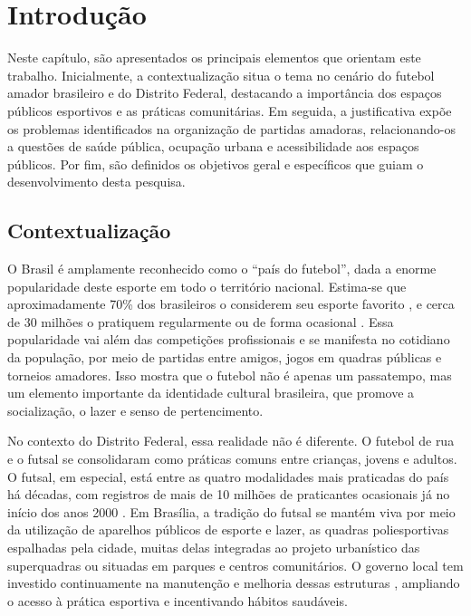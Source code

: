 \chapter[Introdução]{Introdução}
\label{cap:introducao}

  Neste capítulo, são apresentados os principais elementos que orientam este trabalho. Inicialmente, a contextualização situa o tema no cenário do futebol amador brasileiro e do Distrito Federal, destacando a importância dos espaços públicos esportivos e as práticas comunitárias. Em seguida, a justificativa expõe os problemas identificados na organização de partidas amadoras, relacionando-os a questões de saúde pública, ocupação urbana e acessibilidade aos espaços públicos. Por fim, são definidos os objetivos geral e específicos que guiam o desenvolvimento desta pesquisa.

\section{Contextualização}

  O Brasil é amplamente reconhecido como o “país do futebol”, dada a enorme popularidade deste esporte em todo o território nacional. Estima-se que aproximadamente 70\% dos brasileiros o considerem seu esporte favorito \cite{google_esporte_brasil_2021}, e cerca de 30 milhões o pratiquem regularmente ou de forma ocasional \cite{atlasEsporteBrasil2005}. Essa popularidade vai além das competições profissionais e se manifesta no cotidiano da população, por meio de partidas entre amigos, jogos em quadras públicas e torneios amadores. Isso mostra que o futebol não é apenas um passatempo, mas um elemento importante da identidade cultural brasileira, que promove a socialização, o lazer e senso de pertencimento.

  No contexto do Distrito Federal, essa realidade não é diferente. O futebol de rua e o futsal se consolidaram como práticas comuns entre crianças, jovens e adultos. O futsal, em especial, está entre as quatro modalidades mais praticadas do país há décadas, com registros de mais de 10 milhões de praticantes ocasionais já no início dos anos 2000 \cite{atlasEsporteBrasil2005}. Em Brasília, a tradição do futsal se mantém viva por meio da utilização de aparelhos públicos de esporte e lazer, as quadras poliesportivas espalhadas pela cidade, muitas delas integradas ao projeto urbanístico das superquadras ou situadas em parques e centros comunitários. O governo local tem investido continuamente na manutenção e melhoria dessas estruturas \cite{segov2023}, ampliando o acesso à prática esportiva e incentivando hábitos saudáveis.

